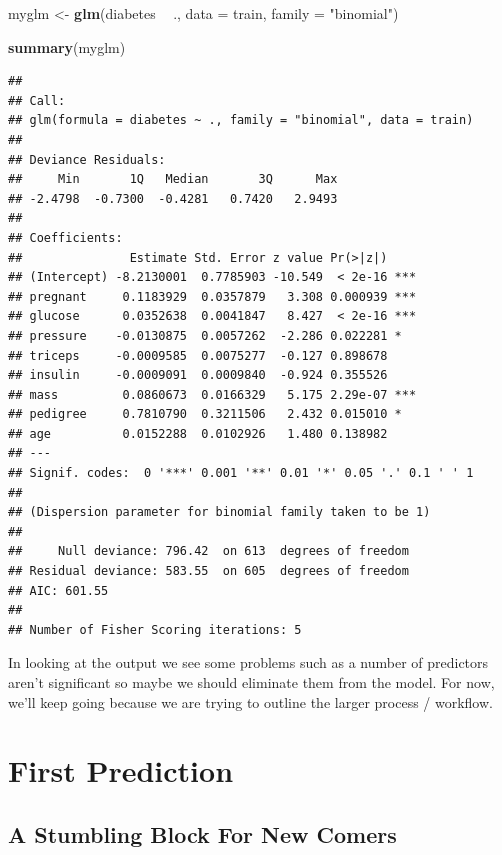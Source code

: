 \documentclass[
]{book}
\newenvironment{Shaded}{\begin{snugshade}}{\end{snugshade}}
\newcommand{\DataTypeTok}[1]{\textcolor[rgb]{0.13,0.29,0.53}{#1}}
\newcommand{\KeywordTok}[1]{\textcolor[rgb]{0.13,0.29,0.53}{\textbf{#1}}}
\newcommand{\NormalTok}[1]{#1}
\newcommand{\OperatorTok}[1]{\textcolor[rgb]{0.81,0.36,0.00}{\textbf{#1}}}
\newcommand{\StringTok}[1]{\textcolor[rgb]{0.31,0.60,0.02}{#1}}
\begin{document}
\begin{Shaded}
\begin{Highlighting}[]
\NormalTok{myglm <-}\StringTok{ }\KeywordTok{glm}\NormalTok{(diabetes }\OperatorTok{~}\StringTok{ }\NormalTok{.,}
             \DataTypeTok{data =}\NormalTok{ train,}
             \DataTypeTok{family =} \StringTok{"binomial"}\NormalTok{)}

\KeywordTok{summary}\NormalTok{(myglm)}
\end{Highlighting}
\end{Shaded}

\begin{verbatim}
## 
## Call:
## glm(formula = diabetes ~ ., family = "binomial", data = train)
## 
## Deviance Residuals: 
##     Min       1Q   Median       3Q      Max  
## -2.4798  -0.7300  -0.4281   0.7420   2.9493  
## 
## Coefficients:
##               Estimate Std. Error z value Pr(>|z|)    
## (Intercept) -8.2130001  0.7785903 -10.549  < 2e-16 ***
## pregnant     0.1183929  0.0357879   3.308 0.000939 ***
## glucose      0.0352638  0.0041847   8.427  < 2e-16 ***
## pressure    -0.0130875  0.0057262  -2.286 0.022281 *  
## triceps     -0.0009585  0.0075277  -0.127 0.898678    
## insulin     -0.0009091  0.0009840  -0.924 0.355526    
## mass         0.0860673  0.0166329   5.175 2.29e-07 ***
## pedigree     0.7810790  0.3211506   2.432 0.015010 *  
## age          0.0152288  0.0102926   1.480 0.138982    
## ---
## Signif. codes:  0 '***' 0.001 '**' 0.01 '*' 0.05 '.' 0.1 ' ' 1
## 
## (Dispersion parameter for binomial family taken to be 1)
## 
##     Null deviance: 796.42  on 613  degrees of freedom
## Residual deviance: 583.55  on 605  degrees of freedom
## AIC: 601.55
## 
## Number of Fisher Scoring iterations: 5
\end{verbatim}

In looking at the output we see some problems such as a number of predictors aren't significant so maybe we should eliminate them from the model. For now, we'll keep going because we are trying to outline the larger process / workflow.

\hypertarget{first-prediction}{%
\section{First Prediction}\label{first-prediction}}

\hypertarget{a-stumbling-block-for-new-comers}{%
\subsection{A Stumbling Block For New Comers}\label{a-stumbling-block-for-new-comers}}
\end{document}
